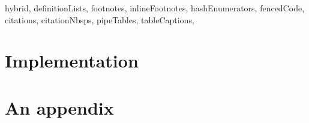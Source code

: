 \documentclass[
  digital,     %
  oneside,     %
  nosansbold,  %
  nocolorbold, %
  lof,         %
  lot,         %
]{fithesis4}
\begin{document}
\begin{markdown*}{%
  hybrid,
  definitionLists,
  footnotes,
  inlineFootnotes,
  hashEnumerators,
  fencedCode,
  citations,
  citationNbsps,
  pipeTables,
  tableCaptions,
}
\chapter{Implementation}
\shorthandoff{-}

\end{markdown*}
\shorthandon{-}

\printbibliography[heading=bibintoc]

\appendix %
\chapter{An appendix}
\end{document}
